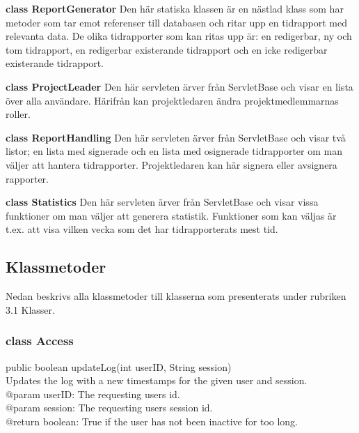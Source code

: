\documentclass[a4paper]{article}
\begin{document}
\vspace{5mm}
\begin{hangparas}{1.5em}{1}
\textbf{class ReportGenerator} Den här statiska klassen är en nästlad klass som har metoder som tar emot referenser till databasen och ritar upp en tidrapport med relevanta data. De olika tidrapporter som kan ritas upp är: en redigerbar, ny och tom tidrapport, en redigerbar existerande tidrapport och en icke redigerbar existerande tidrapport.\end{hangparas}

\vspace{5mm}
\begin{hangparas}{1.5em}{1}
\textbf{class ProjectLeader} Den här servleten ärver från ServletBase och visar en lista över alla användare. Härifrån kan projektledaren ändra projektmedlemmarnas roller. \end{hangparas}

\vspace{5mm}
\begin{hangparas}{1.5em}{1}
\textbf{class ReportHandling} Den här servleten ärver från ServletBase och visar två listor; en lista med signerade och en lista med osignerade tidrapporter om man väljer att hantera tidrapporter. Projektledaren kan här signera eller avsignera rapporter.\end{hangparas}

\vspace{5mm}
\begin{hangparas}{1.5em}{1}
\textbf{class Statistics} Den här servleten ärver från ServletBase och visar vissa funktioner om man väljer att generera statistik. Funktioner som kan väljas är t.ex. att visa vilken vecka som det har tidrapporterats mest tid.\\ \end{hangparas}

\subsection{Klassmetoder}
Nedan beskrivs alla klassmetoder till klasserna som presenterats under rubriken 3.1 Klasser.

\subsubsection{class Access}

\begin{hangparas}{1.5em}{1}
public boolean updateLog(int userID, String session)\\
Updates the log with a new timestamps for the given user and session. \\
@param userID: The requesting users id.\\
@param session: The requesting users session id.\\
@return boolean: True if the user has not been inactive for too long.
\end{hangparas}
\end{document}
